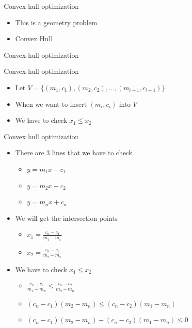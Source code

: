 \documentclass[aspectratio=169,xcolor=dvipsnames]{beamer}
\begin{document}
\begin{frame}[plain]{Convex hull optimization}
    \begin{itemize}
        \item This is a geometry problem
        \item Convex Hull
    \end{itemize}
\end{frame}

\begin{frame}[plain]{Convex hull optimization}

\end{frame}

\begin{frame}[plain]{Convex hull optimization}
    \begin{itemize}
        \item Let $V = \{(m_1, c_1), (m_2, c_2), ..., (m_{i-1}, c_{i-1})\}$
        \item When we want to insert $(m_i, c_i)$ into $V$
        \item We have to check $x_{1} \leq x_2$
    \end{itemize}
\end{frame}

\begin{frame}[plain]{Convex hull optimization}
    \begin{itemize}
        \item<1-> There are 3 lines that we have to check
        \begin{itemize}
            \item $y = m_1x+c_1$
            \item $y = m_2x+c_2$
            \item $y = m_nx+c_n$
        \end{itemize}
        \item<2-> We will get the intersection points
        \begin{itemize}
            \item $x_1 = \frac{c_n-c_1}{m_1-m_n}$
            \item $x_2 = \frac{c_n-c_2}{m_2-m_n}$
        \end{itemize}
        \item<3-> We have to check $x_{1} \leq x_2$
        \begin{itemize}
            \item $\frac{c_n-c_1}{m_1-m_n} \leq \frac{c_n-c_2}{m_2-m_n}$
            \item $(c_n-c_1)(m_2-m_n) \leq (c_n-c_2)(m_1-m_n)$
            \item $(c_n-c_1)(m_2-m_n) - (c_n-c_2)(m_1-m_n) \leq 0$
        \end{itemize}
    \end{itemize}
\end{frame}
\end{document}
